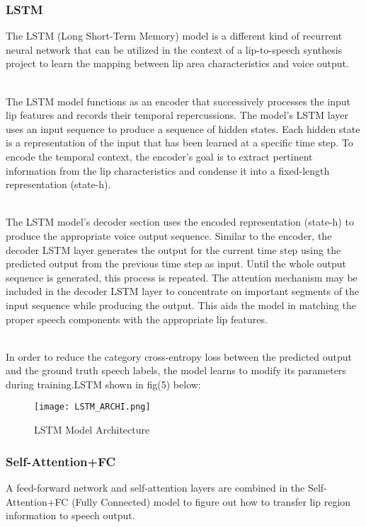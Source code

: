 \documentclass[conference]{IEEEtran}
\begin{document}
\subsubsection{LSTM}
The LSTM (Long Short-Term Memory) model is a different kind of recurrent neural network that can be utilized in the context of a lip-to-speech synthesis project to learn the mapping between lip area characteristics and voice output.

\\ The LSTM model functions as an encoder that successively processes the input lip features and records their temporal repercussions. The model's LSTM layer uses an input sequence to produce a sequence of hidden states. Each hidden state is a representation of the input that has been learned at a specific time step. To encode the temporal context, the encoder's goal is to extract pertinent information from the lip characteristics and condense it into a fixed-length representation (state-h).

\\ The LSTM model's decoder section uses the encoded representation (state-h) to produce the appropriate voice output sequence. Similar to the encoder, the decoder LSTM layer generates the output for the current time step using the predicted output from the previous time step as input. Until the whole output sequence is generated, this process is repeated. The attention mechanism may be included in the decoder LSTM layer to concentrate on important segments of the input sequence while producing the output. This aids the model in matching the proper speech components with the appropriate lip features.

\\ In order to reduce the category cross-entropy loss between the predicted output and the ground truth speech labels, the model learns to modify its parameters during training.LSTM shown in fig(5) below:

\begin{figure}[htbp]
\centerline{\texttt{[image: LSTM\_ARCHI.png]}}
\caption{LSTM Model Architecture}
\label{fig}
\end{figure}

\subsubsection{Self-Attention+FC}
A feed-forward network and self-attention layers are combined in the Self-Attention+FC (Fully Connected) model to figure out how to transfer lip region information to speech output.
\end{document}
